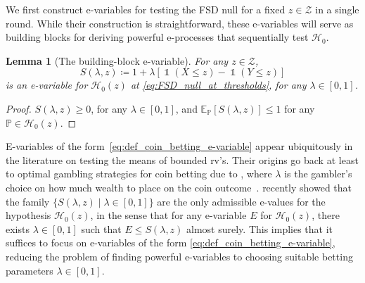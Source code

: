 \documentclass[12pt,twoside]{article}
\theoremstyle{plain}
\newtheorem{lemma}{Lemma}
\theoremstyle{definition}
\theoremstyle{remark}
\newcommand{\inparen}[1]{\left(#1\right)}
\DeclareMathOperator*{\indsymb}{\mathds{1}}
\newcommand{\indicator}[1]{\indsymb\inparen{#1}}
\newcommand{\calH}{\mathcal{H}}
\newcommand{\calZ}{\mathcal{Z}}
\newcommand{\Esymb}{\mathbb{E}}
\newcommand{\Psymb}{\mathbb{P}}
\newcommand{\Ex}[2]{\Esymb_{{#1}}\left[{#2}\right]}
\begin{document}
We first construct e-variables for testing the FSD null for a fixed $z\in \calZ$ in a single round. 
While their construction is straightforward, these e-variables will serve as building blocks for deriving powerful e-processes that sequentially test $\calH_0$.
\begin{lemma}[The building-block e-variable]\label{lem:building-block-e-variables}
    For any $z \in \calZ$,  
    \begin{equation}\label{eq:def_coin_betting_e-variable}
        S(\lambda,z) \coloneqq
        1 + \lambda [\indicator{X \leq z} - \indicator{Y \leq z}]
    \end{equation}
    is an e-variable for $\calH_0(z)$ at \eqref{eq:FSD_null_at_thresholds}, for any $\lambda \in [0,1]$.
\end{lemma}
\begin{proof}
    $S(\lambda,z)\geq 0$, for any $\lambda \in [0,1]$, and $\Ex{\Psymb}{S(\lambda,z)}\leq 1$ for any $\Psymb\in \calH_0(z)$. 
\end{proof}
E-variables of the form~\eqref{eq:def_coin_betting_e-variable} appear ubiquitously in the literature on testing the means of bounded rv's. 
Their origins go back at least to optimal gambling strategies for coin betting due to \citet{kelly1956new}, where $\lambda$ is the gambler's choice on how much wealth to place on the coin outcome~\citep[see, e.g.,][]{orabona2023tight,waudbysmith2020estimating}.
\citet{Eugenio_JAR} recently showed that the family $\{S(\lambda,z) \mid \lambda \in [0,1]\}$ are the only admissible e-values for the hypothesis $\calH_0(z)$, in the sense that for any e-variable $E$ for $\calH_0(z)$, there exists $\lambda \in [0,1]$ such that $E\leq S(\lambda,z)$ almost surely. 
This implies that it suffices to focus on e-variables of the form \eqref{eq:def_coin_betting_e-variable}, reducing the problem of finding powerful e-variables to choosing suitable betting parameters $\lambda \in [0,1]$. 
\end{document}
